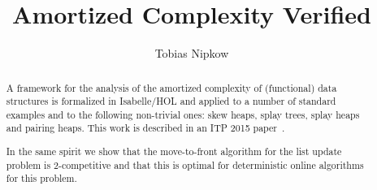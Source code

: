 \documentclass[11pt,a4paper]{article}
\begin{document}
\title{Amortized Complexity Verified}
\author{Tobias Nipkow}
\maketitle

\begin{abstract}
  A framework for the analysis of the amortized complexity of (functional)
  data structures is formalized in Isabelle/HOL and applied to a number of
  standard examples and to the following non-trivial ones: skew heaps,
  splay trees, splay heaps and pairing heaps. This work is described
  in an ITP 2015 paper~\cite{Nipkow-ITP15}.

  In the same spirit we show that the move-to-front algorithm for the list
  update problem is 2-competitive and that this is optimal for deterministic
  online algorithms for this problem.
\end{abstract}

\setcounter{tocdepth}{2}
\tableofcontents
\newpage





\end{document}
